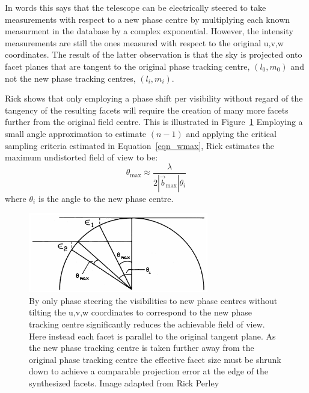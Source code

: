 In words this says that the telescope can be electrically steered to take measurements with respect to a new phase centre by multiplying each known measurment in
the database by a complex exponential. However, the intensity measurements are still the ones measured with respect to the original u,v,w coordinates. The result of
the latter observation is that the sky is projected onto facet planes that are tangent to the original phase tracking centre, $(l_0,m_0)$ and not the new phase 
tracking centres, $(l_i,m_i)$.

Rick shows that only employing a phase shift per visibility without regard of the tangency of the resulting facets will require the creation of many more facets 
further from the original field centre. This is illustrated in Figure~\ref{fig_non_rotated_facets} Employing a small angle approximation to estimate $(n-1)$ and applying the critical sampling criteria estimated in 
Equation~\ref{eqn_wmax}, Rick estimates the maximum undistorted field of view to be:
\begin{equation}
 \theta_{\text{max}} \approx \frac{\lambda}{2|\vec{b}_{\text{max}}|\theta_i}
\end{equation}
where $\theta_i$ is the angle to the new phase centre.

\begin{figure}[h]
  \begin{mdframed}
    \centering
    \includegraphics[width=0.7\textwidth]{images/non_rotated_faceting.png}
    \caption[Faceting without regard of tangency]{By only phase steering the visibilities to new phase centres without tilting the u,v,w coordinates
    to correspond to the new phase tracking centre significantly reduces the achievable field of view. Here instead each facet is parallel to the 
    original tangent plane. As the new phase tracking centre is taken further away from the original phase tracking centre the effective facet size must be
    shrunk down to achieve a comparable projection error at the edge of the synthesized facets. Image adapted from Rick Perley \cite[Lecture 19]{taylor1999synthesis}}
    \label{fig_non_rotated_facets}
  \end{mdframed}
\end{figure}

